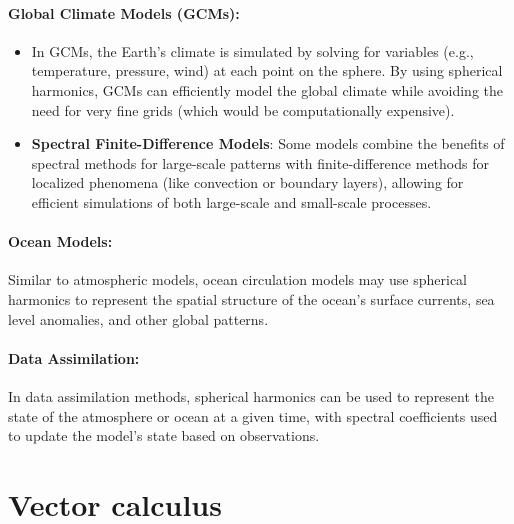 \paragraph{\textbf{Global Climate Models (GCMs)}:}

\begin{itemize}
	\item In GCMs, the Earth's climate is simulated by solving for variables (e.g., temperature, pressure, wind) at each point on the sphere. By using spherical harmonics, GCMs can efficiently model the global climate while avoiding the need for very fine grids (which would be computationally expensive).
	\item \textbf{Spectral Finite-Difference Models}: Some models combine the benefits of spectral methods for large-scale patterns with finite-difference methods for localized phenomena (like convection or boundary layers), allowing for efficient simulations of both large-scale and small-scale processes.
\end{itemize}

\paragraph{\textbf{Ocean Models}:}

Similar to atmospheric models, ocean circulation models may use spherical harmonics to represent the spatial structure of the ocean's surface currents, sea level anomalies, and other global patterns.

\paragraph{\textbf{Data Assimilation}:}

In data assimilation methods, spherical harmonics can be used to represent the state of the atmosphere or ocean at a given time, with spectral coefficients used to update the model's state based on observations.

\section{Vector calculus}
